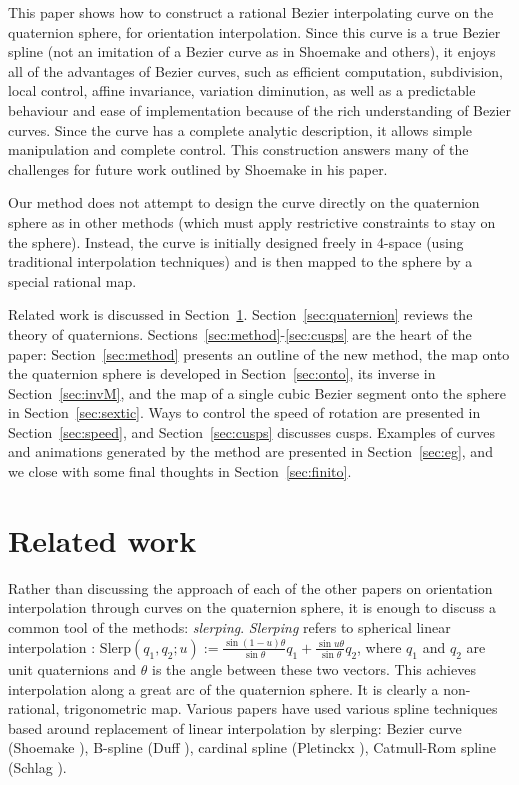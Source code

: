 This paper shows how to construct
a rational Bezier interpolating curve on the
quaternion sphere, for orientation interpolation.
Since this curve is a true Bezier spline (not an imitation of a Bezier
curve as in Shoemake and others),
it enjoys all of the advantages of Bezier curves, such as efficient
computation, subdivision, local control, affine invariance, 
variation diminution, as well as a predictable behaviour and ease of 
implementation because of the rich understanding of Bezier curves.
Since the curve has a complete analytic description, it allows
simple manipulation and complete control.
This construction answers many of the challenges for future work
outlined by Shoemake in his paper.

Our method does not attempt to design the curve directly on the
quaternion sphere as in other methods (which must apply restrictive
constraints to stay on the sphere).
Instead, the curve is initially designed freely in 4-space
(using traditional interpolation techniques)
and is then mapped to the sphere by a special rational map.


Related work is discussed in Section~\ref{sec:related}.
Section~\ref{sec:quaternion} reviews the theory of quaternions.
Sections~\ref{sec:method}-\ref{sec:cusps} are the heart of the paper:
Section~\ref{sec:method} presents an outline of the new method,
the map onto the quaternion sphere is developed in Section~\ref{sec:onto},
its inverse in Section~\ref{sec:invM}, and the map of a single cubic Bezier
segment onto the sphere in Section~\ref{sec:sextic}.
Ways to control the speed of rotation are presented in Section~\ref{sec:speed},
and Section~\ref{sec:cusps} discusses cusps.
Examples of curves and animations generated by the method 
are presented in Section~\ref{sec:eg},
and we close with some final thoughts in Section~\ref{sec:finito}.

\section{Related work}
\label{sec:related}

Rather than discussing the approach of each of the other papers
on orientation interpolation through curves on the quaternion sphere,
it is enough to discuss a common tool of the methods: {\em slerping}.
{\em Slerping} refers to spherical linear interpolation
\cite{shoemake85}:
$\mbox{Slerp}(q_1,q_2;u) 
:= \frac{\sin (1-u) \theta}{\sin \theta} q_1 + 
   \frac{\sin u \theta}{\sin \theta} q_2$,
where $q_1$ and $q_2$ are unit quaternions and $\theta$
is the angle between these two vectors.
This achieves interpolation along a great arc of the quaternion sphere.
It is clearly a non-rational, trigonometric map.
Various papers have used various spline techniques based around replacement
of linear interpolation by slerping:
Bezier curve (Shoemake \cite{shoemake85}),
B-spline (Duff \cite{duff85}),
cardinal spline (Pletinckx \cite{pletinckx89}),
Catmull-Rom spline (Schlag \cite{schlag91}).

